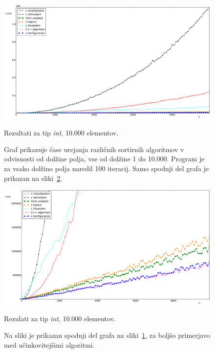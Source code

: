 \documentclass[a4paper,oneside,12pt]{article}
\begin{document}
\begin{figure}[h!]
    \includegraphics[width=\textwidth]{slike/int10000.pdf}
    \vspace{-0.7cm}
    \caption[Rezultati za tip  \emph{int}, 10.000 el.]{Rezultati za tip
    \emph{int}, 10.000 elementov.} 
    \caption*{{\small Graf prikazuje čase
    urejanja različnih sortirnih algoritmov v odvisnosti od dolžine polja, vse
    od dolžine 1 do 10.000. Program je za vsako dolžino polja naredil 100
    iteracij. Samo spodnji del grafa je prikazan na
    sliki~\ref{fig:rez:intblizu}.}}
    \label{fig:rez:int}
\end{figure}

\begin{figure}[h!]
    \begin{center}
        \includegraphics[width=\textwidth]{slike/int10000zoom.pdf}
    \end{center}
    \vspace{-0.7cm}
    \caption[Rezultati za tip \emph{int}, 10.000 el. -- izrez]{Rezulati za tip
    \emph{int}, 10.000 elementov.}
    \caption*{{\small Na sliki je prikazan
    spodnji del grafa na sliki~\ref{fig:rez:int}, za boljšo primerjavo med
    učinkovitejšimi algoritmi.}}
    \label{fig:rez:intblizu}
\end{figure}
\end{document}
